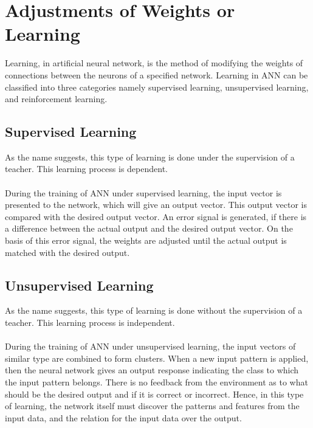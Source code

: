 \documentclass{report}
\begin{document}
\section{Adjustments of Weights or Learning}
Learning, in artificial neural network, is the method of modifying the weights of connections between the neurons of a specified network. Learning in ANN can be classified into three categories namely supervised learning, unsupervised learning, and reinforcement learning.
\subsection{Supervised Learning}

As the name suggests, this type of learning is done under the supervision of a teacher. This learning process is dependent.
\paragraph{}
During the training of ANN under supervised learning, the input vector is presented to the network, which will give an output vector. This output vector is compared with the desired output vector. An error signal is generated, if there is a difference between the actual output and the desired output vector. On the basis of this error signal, the weights are adjusted until the actual output is matched with the desired output.


\subsection{Unsupervised Learning}
As the name suggests, this type of learning is done without the supervision of a teacher. This learning process is independent.
\paragraph{}
During the training of ANN under unsupervised learning, the input vectors of similar type are combined to form clusters. When a new input pattern is applied, then the neural network gives an output response indicating the class to which the input pattern belongs.
There is no feedback from the environment as to what should be the desired output and if it is correct or incorrect. Hence, in this type of learning, the network itself must discover the patterns and features from the input data, and the relation for the input data over the output.
\end{document}
